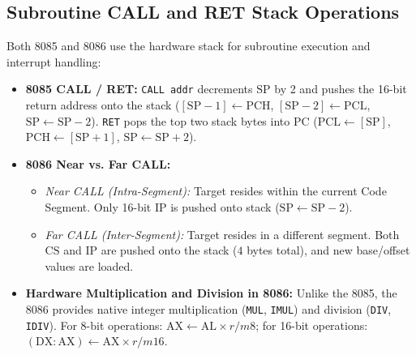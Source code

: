 \documentclass[12pt,a4paper]{article}
\begin{document}
\subsection{Subroutine CALL and RET Stack Operations}
Both 8085 and 8086 use the hardware stack for subroutine execution and interrupt handling:
\begin{itemize}[leftmargin=*]
  \item \textbf{8085 CALL / RET:} \texttt{CALL addr} decrements $\mathrm{SP}$ by 2 and pushes the 16-bit return address onto the stack ($[\mathrm{SP}-1] \leftarrow \mathrm{PCH}$, $[\mathrm{SP}-2] \leftarrow \mathrm{PCL}$, $\mathrm{SP} \leftarrow \mathrm{SP}-2$). \texttt{RET} pops the top two stack bytes into $\mathrm{PC}$ ($\mathrm{PCL} \leftarrow [\mathrm{SP}]$, $\mathrm{PCH} \leftarrow [\mathrm{SP}+1]$, $\mathrm{SP} \leftarrow \mathrm{SP}+2$).
  \item \textbf{8086 Near vs. Far CALL:}
  \begin{itemize}[leftmargin=*]
    \item \textit{Near CALL (Intra-Segment):} Target resides within the current Code Segment. Only 16-bit $\mathrm{IP}$ is pushed onto stack ($\mathrm{SP} \leftarrow \mathrm{SP}-2$).
    \item \textit{Far CALL (Inter-Segment):} Target resides in a different segment. Both $\mathrm{CS}$ and $\mathrm{IP}$ are pushed onto the stack ($4$ bytes total), and new base/offset values are loaded.
  \end{itemize}
  \item \textbf{Hardware Multiplication and Division in 8086:}
  Unlike the 8085, the 8086 provides native integer multiplication (\texttt{MUL}, \texttt{IMUL}) and division (\texttt{DIV}, \texttt{IDIV}). For 8-bit operations: $\mathrm{AX} \leftarrow \mathrm{AL} \times r/m8$; for 16-bit operations: $(\mathrm{DX}:\mathrm{AX}) \leftarrow \mathrm{AX} \times r/m16$.
\end{itemize}
\end{document}
